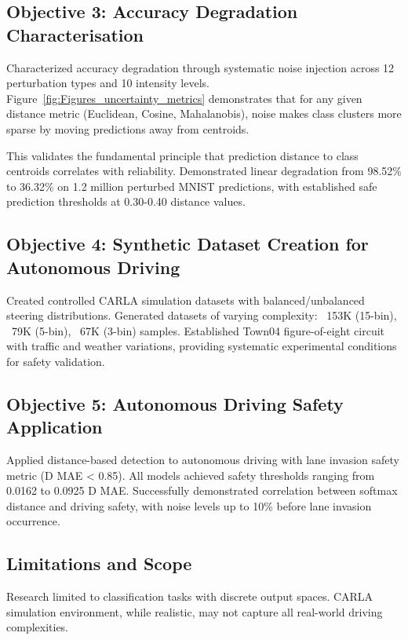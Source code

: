 \subsection{Objective 3: Accuracy Degradation Characterisation}

Characterized accuracy degradation through systematic noise injection across 12 perturbation types and 10 intensity levels. Figure~\ref{fig:Figures_uncertainty_metrics} demonstrates that for any given distance metric (Euclidean, Cosine, Mahalanobis), noise makes class clusters more sparse by moving predictions away from centroids.

This validates the fundamental principle that prediction distance to class centroids correlates with reliability. Demonstrated linear degradation from 98.52\% to 36.32\% on 1.2 million perturbed MNIST predictions, with established safe prediction thresholds at 0.30-0.40 distance values.

\subsection{Objective 4: Synthetic Dataset Creation for Autonomous Driving}

Created controlled CARLA simulation datasets with balanced/unbalanced steering distributions. Generated datasets of varying complexity: ~153K (15-bin), ~79K (5-bin), ~67K (3-bin) samples. Established Town04 figure-of-eight circuit with traffic and weather variations, providing systematic experimental conditions for safety validation.

\subsection{Objective 5: Autonomous Driving Safety Application}

Applied distance-based detection to autonomous driving with lane invasion safety metric (D MAE < 0.85). All models achieved safety thresholds ranging from 0.0162 to 0.0925 D MAE. Successfully demonstrated correlation between softmax distance and driving safety, with noise levels up to 10\% before lane invasion occurrence.

\subsection{Limitations and Scope}

Research limited to classification tasks with discrete output spaces. CARLA simulation environment, while realistic, may not capture all real-world driving complexities.

